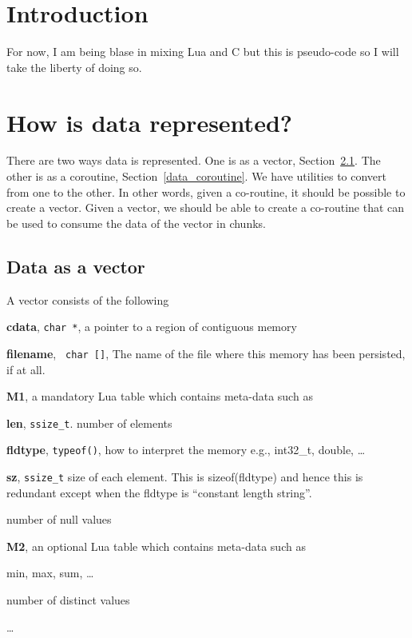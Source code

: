 \newcommand{\Assign}{\verb+:=+ }

\section{Introduction}

For now, I am being blase in mixing Lua and C but this is pseudo-code 
so I will take the liberty of doing so.

\TBC


\section{How is data represented?}
There are two ways data is represented. One is as a vector,
Section~\ref{data_vector}. The other is as a coroutine,
Section~\ref{data_coroutine}. We have utilities to convert from one to
the other. In other words, given a co-routine, it should be possible
to create a vector. Given a vector, we should be able to create a
co-routine that can be used to consume the data of the vector in
chunks.

\subsection{Data as a vector}
\label{data_vector}

A vector consists of the following
\be
\item {\bf cdata}, \verb+char *+, a pointer to a region of contiguous memory
\item {\bf filename}, \verb+ char []+, The name of the file where this memory has been
persisted, if at all. 
\item {\bf M1}, a mandatory Lua table which contains meta-data such as 
\be
\item {\bf len}, \verb+ssize_t+. number of elements
\item {\bf fldtype}, \verb+typeof()+, how to interpret the memory 
e.g., int32\_t, double, \ldots 
\item {\bf sz}, \verb+ssize_t+ size of each element. This is sizeof(fldtype) and
hence this is redundant except when the fldtype is ``constant length
string''.
\item number of null values
\ee
\item {\bf M2}, an optional Lua table which contains meta-data such as 
\be
\item min, max, sum, \ldots
\item number of distinct values
\item \ldots
\ee

